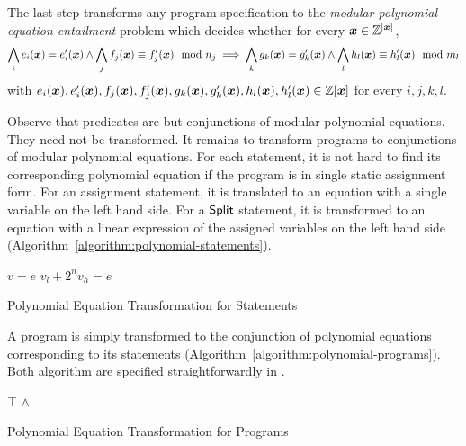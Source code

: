 
The last step transforms any program specification to the 
\emph{modular polynomial equation entailment} problem which decides
whether for every $\vx \in \bbfZ^{|\vx|}$,
\[
  \bigwedge\limits_i e_i (\vx) = e'_i (\vx) \wedge
  \bigwedge\limits_j f_j (\vx) \equiv f'_j (\vx) \mod n_j
  \implies
  \bigwedge\limits_k g_k (\vx) = g'_k (\vx) \wedge
  \bigwedge\limits_l   h_l (\vx) \equiv h'_l (\vx) \mod m_l
\]
with 
$e_i (\vx), e'_i (\vx), f_j (\vx), f'_j (\vx),
 g_k (\vx), g'_k (\vx), h_l (\vx), h'_l (\vx) \in \bbfZ[\vx]$
for every $i, j, k, l$.

Observe that predicates are but conjunctions of modular polynomial
equations. They need not be transformed. It remains to transform
programs to conjunctions of modular polynomial equations. For each
statement, it is not hard to find its corresponding polynomial
equation if the program is in single static assignment form. For an
assignment statement, it is translated to an equation with a single
variable on the left hand side. For a $\mbox{\textsf{Split}}$ statement, it
is transformed to an equation with a linear expression of the 
assigned variables on the left hand side
(Algorithm~\ref{algorithm:polynomial-statements}). 
\begin{algorithm}
  \begin{algorithmic}[1]
        \Return $v = e$
      \EndCase
        \Return $v_l + 2^n v_h = e$
      \EndCase
    \EndMatch
    \EndFunction
  \end{algorithmic}
  \caption{Polynomial Equation Transformation for Statements}
  \label{algorithm:polynomial-statements}
\end{algorithm}

A program is simply transformed to the conjunction of polynomial
equations corresponding to its statements
(Algorithm~\ref{algorithm:polynomial-programs}). Both algorithm are
specified straightforwardly in \coq.

\begin{algorithm}
  \begin{algorithmic}[1]
      \Case{$\epsilon$} \Return $\top$ \EndCase
        \Return {} $\wedge$
      \EndCase
    \EndMatch
    \EndFunction
  \end{algorithmic}
  \caption{Polynomial Equation Transformation for Programs}
  \label{algorithm:polynomial-programs}
\end{algorithm}

